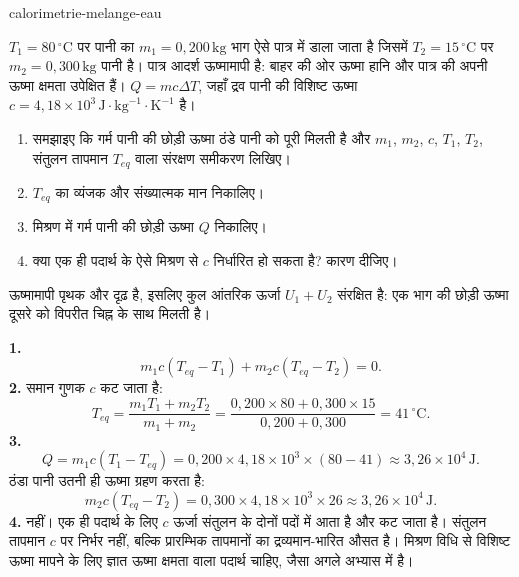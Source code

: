 \begin{exo}[पानी के दो द्रव्यमानों का मिश्रण]{calorimetrie-melange-eau}

$T_1=80\,^\circ\text{C}$ पर पानी का $m_1=0{,}200\,\text{kg}$ भाग ऐसे पात्र में डाला जाता है जिसमें $T_2=15\,^\circ\text{C}$ पर $m_2=0{,}300\,\text{kg}$ पानी है। पात्र आदर्श ऊष्मामापी है: बाहर की ओर ऊष्मा हानि और पात्र की अपनी ऊष्मा क्षमता उपेक्षित हैं। $Q=mc\Delta T$, जहाँ द्रव पानी की विशिष्ट ऊष्मा $c=4{,}18\times10^3\,\text{J}\!\cdot\!\text{kg}^{-1}\!\cdot\!\text{K}^{-1}$ है।
\begin{enumerate}
  \item समझाइए कि गर्म पानी की छोड़ी ऊष्मा ठंडे पानी को पूरी मिलती है और $m_1$, $m_2$, $c$, $T_1$, $T_2$, संतुलन तापमान $T_{eq}$ वाला संरक्षण समीकरण लिखिए।
  \item $T_{eq}$ का व्यंजक और संख्यात्मक मान निकालिए।
  \item मिश्रण में गर्म पानी की छोड़ी ऊष्मा $Q$ निकालिए।
  \item क्या एक ही पदार्थ के ऐसे मिश्रण से $c$ निर्धारित हो सकता है? कारण दीजिए।
\end{enumerate}
\begin{indication}
ऊष्मामापी पृथक और दृढ़ है, इसलिए कुल आंतरिक ऊर्जा $U_1+U_2$ संरक्षित है: एक भाग की छोड़ी ऊष्मा दूसरे को विपरीत चिह्न के साथ मिलती है।
\end{indication}
\begin{solution}
\textbf{1.}
\[
m_1c(T_{eq}-T_1)+m_2c(T_{eq}-T_2)=0.
\]
\textbf{2.} समान गुणक $c$ कट जाता है:
\[
T_{eq}=\frac{m_1T_1+m_2T_2}{m_1+m_2}
=\frac{0{,}200\times80+0{,}300\times15}{0{,}200+0{,}300}=41\,^\circ\text{C}.
\]
\textbf{3.}
\[
Q=m_1c(T_1-T_{eq})=0{,}200\times4{,}18\times10^3\times(80-41)
\approx3{,}26\times10^4\,\text{J}.
\]
ठंडा पानी उतनी ही ऊष्मा ग्रहण करता है:
\[
m_2c(T_{eq}-T_2)=0{,}300\times4{,}18\times10^3\times26
\approx3{,}26\times10^4\,\text{J}.
\]
\textbf{4.} नहीं। एक ही पदार्थ के लिए $c$ ऊर्जा संतुलन के दोनों पदों में आता है और कट जाता है। संतुलन तापमान $c$ पर निर्भर नहीं, बल्कि प्रारम्भिक तापमानों का द्रव्यमान-भारित औसत है। मिश्रण विधि से विशिष्ट ऊष्मा मापने के लिए ज्ञात ऊष्मा क्षमता वाला पदार्थ चाहिए, जैसा अगले अभ्यास में है।
\end{solution}
\end{exo}

